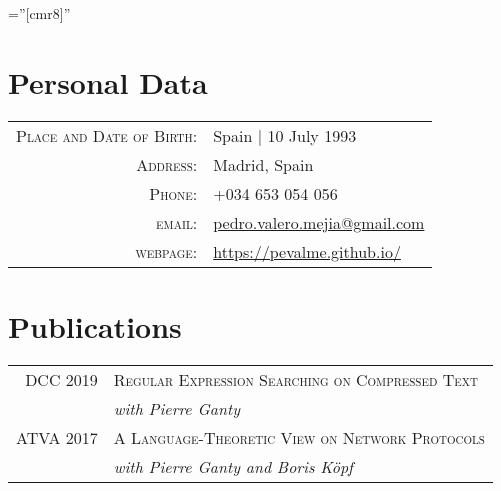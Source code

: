 \documentclass[a4paper,10pt]{article} %
\begin{document}
\pagestyle{empty} %

\font\fb=''[cmr8]'' %


\par{\bigskip\par} %

\section{Personal Data}

\begin{tabular}{rl}
\textsc{Place and Date of Birth:} & Spain  | 10 July 1993 \\
\textsc{Address:} & Madrid, Spain \\
\textsc{Phone:} & +034 653 054 056\\
\textsc{email:} & \href{mailto:pedro.valero.mejia@gmail.com}{pedro.valero.mejia@gmail.com} \\
\textsc{webpage:} & \href{https://pevalme.github.io/}{https://pevalme.github.io/}\\
\end{tabular}


\section{Publications}
\begin{tabular}{rl}
\textsc{DCC} 2019 & \textsc{Regular Expression Searching on Compressed Text} \\
 & \textit{with Pierre Ganty} \\
\textsc{ATVA} 2017 & \textsc{A Language-Theoretic View on Network Protocols} \\
& \textit{with Pierre Ganty and Boris Köpf} \\
\end{tabular}

\end{document}
